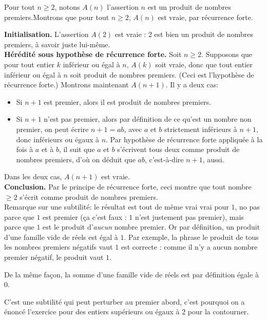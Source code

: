\begin{Soln}{43}
Pour tout $n\geq 2$, notons $A(n)$ l'assertion \og $n$ est un produit de nombres premiers.\fg Montrons que pour tout $n\geq 2$, $A(n)$ est vraie, par récurrence forte.

\textbf{Initialisation.} L'assertion $A(2)$ est vraie : $2$ est bien un produit de nombres premiers, à savoir juste lui-même.\\
\textbf{Hérédité sous hypothèse de récurrence forte.} Soit $n\geq 2$. Supposons que pour tout entier $k$ inférieur ou égal à $n$, $A(k)$ soit vraie, donc que tout entier inférieur ou égal à $n$ soit produit de nombres premiers. (Ceci est l'hypothèse de récurrence forte.) Montrons maintenant $A(n+1)$. Il y a deux cas:
\begin{itemize}
\item Si $n+1$ est premier, alors il est produit de nombres premiers.
\item Si $n+1$ n'est pas premier, alors par définition de ce qu'est un nombre non premier, on peut écrire $n+1 = ab$, avec $a$ et $b$ strictement inférieurs à $n+1$, donc inférieurs ou égaux à $n$. Par hypothèse de récurrence forte appliquée à la fois à $a$ et à $b$, il suit que $a$ et $b$ s'écrivent tous deux comme produit de nombres premiers, d'où on déduit que $ab$, c'est-à-dire $n+1$, aussi.
\end{itemize}
Dans les deux cas, $A(n+1)$ est vraie.\\
\textbf{Conclusion.} Par le principe de récurrence forte, ceci montre que tout nombre $\geq 2$ s'écrit comme produit de nombres premiers.\\


Remarque sur une subtilité: le résultat est tout de même vrai vrai pour $1$, no pas parce que $1$ est premier (ça c'est faux : $1$ n'est justement pas premier), mais parce que $1$ est le produit d'\emph{aucun} nombre premier. Or par définition, un produit d'une famille vide de réels est égal à $1$. Par exemple, la phrase \og le produit de tous les nombres premiers négatifs vaut $1$\fg{} est correcte : comme il n'y a aucun nombre premier négatif, le produit vaut $1$.

De la même façon, la somme d'une famille vide de réels est par définition égale à $0$.

C'est une subtilité qui peut perturber au premier abord, c'est pourquoi on a énoncé l'exercice pour des entiers supérieurs ou égaux à $2$ pour la contourner.
\end{Soln}
